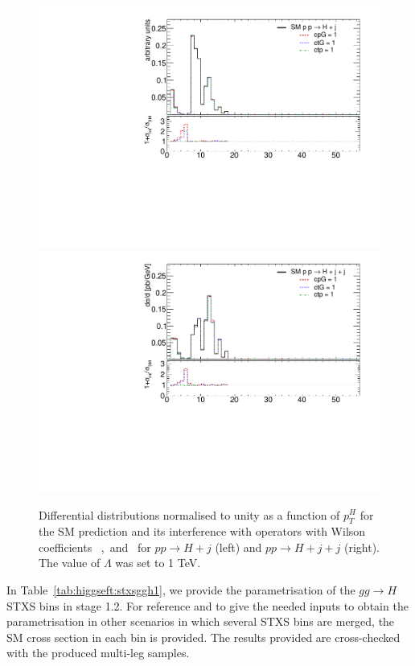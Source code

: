 \begin{figure}
\includegraphics[width=0.49\linewidth,page=5]{figures/kinematics_gghj_more.pdf}
\includegraphics[width=0.49\linewidth,page=5]{figures/kinematics_gghjj.pdf}

\label{fig:higgseft:ggh}
\caption{Differential distributions normalised to unity as a function of $p_{T}^{H}$ for the SM prediction and its interference with operators with Wilson coefficients \cpG\ ,\ctG\ and \ctp\ for $p p \to H + j$ (left) and $p p \to H + j + j$ (right). The value of $\Lambda$ was set to 1 TeV.}
\end{figure}
  
  

 In Table~\ref{tab:higgseft:stxsggh1}, we provide the parametrisation of the $gg\to H$ STXS bins in stage 1.2. For reference and to give the needed inputs to obtain the parametrisation in other scenarios in which several STXS bins are merged, the SM cross section in each bin is provided. The results provided are cross-checked with the produced multi-leg samples. 

 
 
